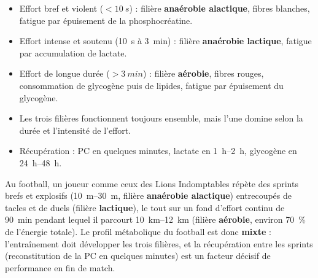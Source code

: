 \documentclass[11pt]{article}
\begin{document}
\begin{aretenir}
\begin{itemize}
\item Effort bref et violent ($< \SI{10}{s}$) : filière \textbf{anaérobie alactique}, fibres blanches, fatigue par épuisement de la phosphocréatine.
\item Effort intense et soutenu (\SI{10}{s} à \SI{3}{min}) : filière \textbf{anaérobie lactique}, fatigue par accumulation de lactate.
\item Effort de longue durée ($> \SI{3}{min}$) : filière \textbf{aérobie}, fibres rouges, consommation de glycogène puis de lipides, fatigue par épuisement du glycogène.
\item Les trois filières fonctionnent toujours ensemble, mais l'une domine selon la durée et l'intensité de l'effort.
\item Récupération : PC en quelques minutes, lactate en \SIrange{1}{2}{h}, glycogène en \SIrange{24}{48}{h}.
\end{itemize}
\end{aretenir}

\begin{savaistu}
Au football, un joueur comme ceux des Lions Indomptables répète des sprints brefs et explosifs (\SIrange{10}{30}{m}, filière \textbf{anaérobie alactique}) entrecoupés de tacles et de duels (filière \textbf{lactique}), le tout sur un fond d'effort continu de \SI{90}{min} pendant lequel il parcourt \SIrange{10}{12}{km} (filière \textbf{aérobie}, environ \SI{70}{\%} de l'énergie totale). Le profil métabolique du football est donc \textbf{mixte} : l'entraînement doit développer les trois filières, et la récupération entre les sprints (reconstitution de la PC en quelques minutes) est un facteur décisif de performance en fin de match.
\end{savaistu}
\end{document}
